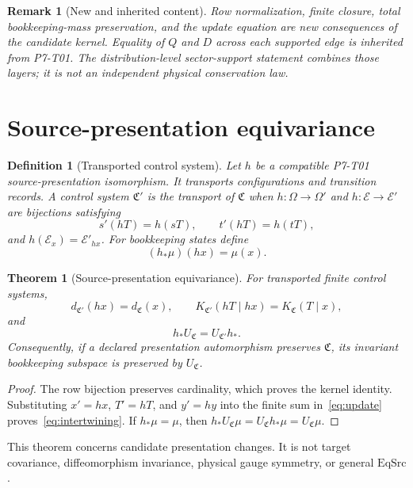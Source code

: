 \documentclass[11pt]{article}
\newtheorem{definition}{Definition}
\newtheorem{theorem}{Theorem}
\newtheorem{remark}{Remark}
\newcommand{\Control}{\mathfrak C}
\newcommand{\Enabled}{\mathcal E}
\newcommand{\Update}{U_{\Control}}
\begin{document}
\begin{remark}[New and inherited content]
Row normalization, finite closure, total bookkeeping-mass preservation, and
the update equation are new consequences of the candidate kernel. Equality
of \(Q\) and \(D\) across each supported edge is inherited from P7-T01.
The distribution-level sector-support statement combines those layers; it is
not an independent physical conservation law.
\end{remark}

\section{Source-presentation equivariance}

\begin{definition}[Transported control system]
Let \(h\) be a compatible P7-T01 source-presentation isomorphism. It transports
configurations and transition records. A control system \(\Control'\) is the
transport of \(\Control\) when \(h:\Omega\to\Omega'\) and
\(h:\Enabled\to\Enabled'\) are bijections satisfying
\[
  s'(hT)=h(sT),\qquad t'(hT)=h(tT),
\]
and \(h(\Enabled_x)=\Enabled'_{hx}\).
For bookkeeping states define
\[
  (h_*\mu)(hx)=\mu(x).
\]
\end{definition}

\begin{theorem}[Source-presentation equivariance]
\label{thm:equivariance}
For transported finite control systems,
\[
  d_{\Control'}(hx)=d_{\Control}(x),
  \qquad
  K_{\Control'}(hT\mid hx)=K_{\Control}(T\mid x),
\]
and
\begin{equation}
  h_*\Update=U_{\Control'}h_*.
  \label{eq:intertwining}
\end{equation}
Consequently, if a declared presentation automorphism preserves
\(\Control\), its invariant bookkeeping subspace is preserved by
\(\Update\).
\end{theorem}

\begin{proof}
The row bijection preserves cardinality, which proves the kernel identity.
Substituting \(x'=hx\), \(T'=hT\), and \(y'=hy\) into the finite sum
in~\eqref{eq:update} proves~\eqref{eq:intertwining}. If \(h_*\mu=\mu\),
then \(h_*\Update\mu=\Update h_*\mu=\Update\mu\).
\end{proof}

This theorem concerns candidate presentation changes. It is not target
covariance, diffeomorphism invariance, physical gauge symmetry, or general
\(\mathrm{EqSrc}\).
\end{document}
